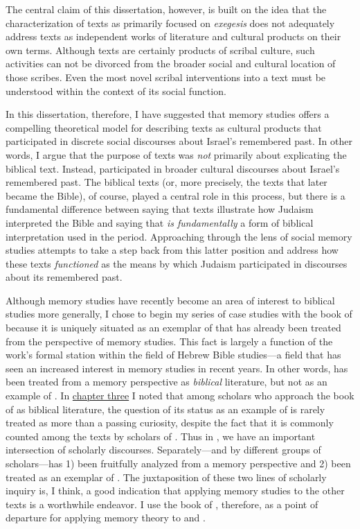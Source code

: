 The central claim of this dissertation, however, is built on the idea that the characterization of \rwb texts as primarily focused on \emph{exegesis} does not adequately address \rwb texts as independent works of literature and cultural products on their own terms. Although \rwb texts are certainly products of scribal culture, such activities can not be divorced from the broader social and cultural location of those scribes. Even the most novel scribal interventions into a text must be understood within the context of its social function.

In this dissertation, therefore, I have suggested that memory studies offers a compelling theoretical model for describing \rwb texts as cultural products that participated in discrete social discourses about Israel's remembered past. In other words, I argue that the purpose of \rwb texts was \emph{not} primarily about explicating the biblical text. Instead, \rwb participated in broader cultural discourses about Israel's remembered past. The biblical texts (or, more precisely, the texts that later became the Bible), of course, played a central role in this process, but there is a fundamental difference between saying that \rwb texts illustrate how \secondtemple Judaism interpreted the Bible and saying that \rwb \emph{is fundamentally} a form of biblical interpretation used in the \secondtemple period. Approaching \rwb through the lens of social memory studies attempts to take a step back from this latter position and address how these texts \emph{functioned} as the means by which \secondtemple Judaism participated in discourses about its remembered past.

Although memory studies have recently become an area of interest to biblical studies more generally, I chose to begin my series of case studies with the book of \chronicles because it is uniquely situated as an exemplar of \rwb that has already been treated from the perspective of memory studies. This fact is largely a function of the work's formal station within the field of Hebrew Bible studies---a field that has seen an increased interest in memory studies in recent years. In other words, \chronicles has been treated from a memory perspective as \emph{biblical} literature, but not as an example of \rwb. In \hyperref[chap:chronicles]{chapter three} I noted that among scholars who approach the book of \chronicles as biblical literature, the question of its status as an example of \rwb is rarely treated as more than a passing curiosity, despite the fact that it is commonly counted among the \rwb texts by scholars of \rwb. Thus in \chronicles, we have an important intersection of scholarly discourses. Separately---and by different groups of scholars---\chronicles has 1) been fruitfully analyzed from a memory perspective and 2) been treated as an exemplar of \rwb. The juxtaposition of these two lines of scholarly inquiry is, I think, a good indication that applying memory studies to the other \rwb texts is a worthwhile endeavor. I use the book of \chronicles, therefore, as a point of departure for applying memory theory to \ga and \jub. 

